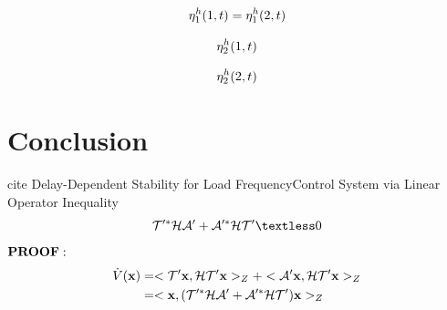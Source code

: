 \documentclass[twocolumn]{autart}    %
\begin{document}
\begin{exmp}
\begin{equation}
    \begin{aligned}
        \setlength{\arraycolsep}{0.9pt}
        \eta^{h}_{1}(1,t) = \eta^{h}_{1}(2,t) 
    \end{aligned}
    \nonumber
\end{equation}

\begin{equation}
    \begin{aligned}
        \setlength{\arraycolsep}{0.9pt}
        \eta^{h}_{2}(1,t) 
    \end{aligned}
    \nonumber
\end{equation}

\begin{equation}
    \begin{aligned}
        \setlength{\arraycolsep}{0.9pt}
        \eta^{h}_{2}(2,t) 
    \end{aligned}
    \nonumber
\end{equation}

\end{exmp}


\section{Conclusion}
cite Delay-Dependent Stability for Load FrequencyControl System via Linear Operator Inequality 
\begin{equation}
    \begin{aligned}
        \setlength{\arraycolsep}{0.9pt}
        \mathcal{T}'^{*}\mathcal{H}\mathcal{A}'+\mathcal{A}'^{*}\mathcal{H}\mathcal{T}' \textless 0
    \end{aligned}
\end{equation}
$\bold{PROOF:}$ 
\begin{equation}
    \begin{aligned}
        \setlength{\arraycolsep}{0.9pt}
        \dot{V}(\bold{x}) &= <\mathcal{T}'\bold{x},\mathcal{H}\mathcal{T}'\bold{x}>_{Z} + <\mathcal{A}'\bold{x},\mathcal{H}\mathcal{T}'\bold{x}>_{Z} \\ &=<\bold{x},(\mathcal{T}'^{*}\mathcal{H}\mathcal{A}'+\mathcal{A}'^{*}\mathcal{H}\mathcal{T}')\bold{x}>_{Z}  
    \end{aligned}
\end{equation}
\end{document}
